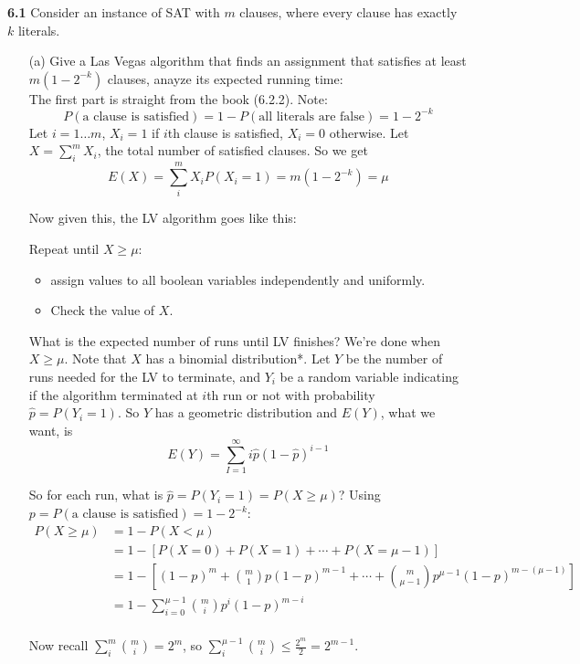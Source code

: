 \documentclass[10pt]{article}
\begin{document}
\textbf{6.1} 
\label{Q6.1}
Consider an instance of SAT with $m$ clauses, where every clause has
exactly $k$ literals.
\begin{enumerate}
\item[(a)]  Give a Las Vegas algorithm that finds an
assignment that satisfies at least $m(1-2^{-k})$ clauses, anayze its
expected running time:\\

The first part is straight from the book (6.2.2). Note:
$$P(\text{a clause is satisfied}) = 1 - P(\text{all literals are
  false}) = 1 - 2^{-k}$$
Let $i= 1\dots m$, $X_i = 1$ if $i$th clause is satisfied, $X_i=0$
otherwise. 
Let $X = \sum_{i}^m X_i$, the total number of satisfied clauses.
So we get $$E(X) = \sum_i^m X_iP(X_i=1) = m(1-2^{-k}) = \mu$$

Now given this, the LV algorithm goes like this:

Repeat until $X \ge \mu$:
\begin{itemize}
\item assign values to all boolean variables independently and uniformly.
\item Check the value of $X$.
\end{itemize}

What is the expected number of runs until LV finishes? We're done
when $X \ge \mu$. Note that $X$
has a binomial distribution*. Let $Y$ be the number of runs needed for
the LV to terminate, and $Y_i$ be a random variable indicating if the
algorithm terminated at $i$th run or not with probability $\hat{p} =
P(Y_i = 1)$. So $Y$ has a geometric distribution and $E(Y)$, what we
want, is
\begin{equation}
  \label{eq:1}
E(Y) = \sum_{I=1}^\infty i\hat{p}(1-\hat{p})^{i-1}
\end{equation}


So for each run, what is $\hat{p} = P(Y_i = 1) = P(X\ge \mu)$? Using $p
= P(\text{a clause is satisfied}) = 1 - 2^{-k}$:
\begin{align*}
  P(X\ge \mu) &= 1 - P(X < \mu)\\
&= 1 - [ P(X=0) + P(X=1) + \cdots + P(X = \mu -1)]\\
&= 1 - [(1-p)^m + {m \choose 1}p(1-p)^{m-1} + \cdots + {m
 \choose \mu - 1} p^{\mu-1}(1-p)^{m -(\mu -1)}]\\
&= 1 - \sum_{i=0}^{\mu-1}{m \choose i}p^i(1-p)^{m-i}\\
\end{align*}

Now recall $\sum_i^m{m \choose i} = 2^m$, so $\sum_i^{\mu -1} {m
  \choose i} \le \frac{2^m}{2} = 2^{m-1}$. 


\end{enumerate}
\end{document}
